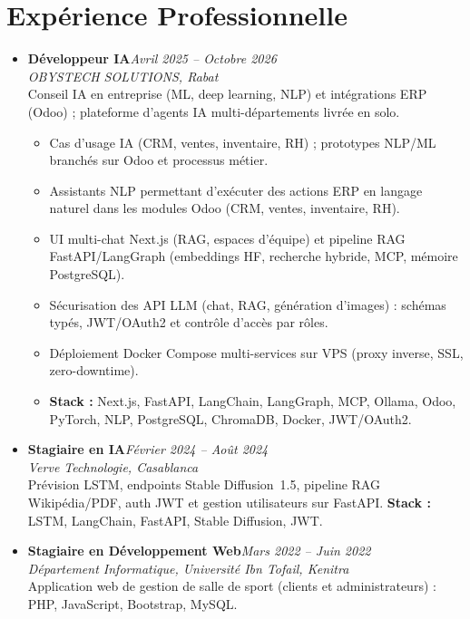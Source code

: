 \documentclass[10pt,a4paper]{article}
\newcommand{\role}[2]{\textbf{#1}\hfill\textit{\color{muted}#2}\\}
\newcommand{\org}[1]{\textit{#1}\\[0.5pt]}
\begin{document}
\section*{Expérience Professionnelle}
\begin{itemize}
    \item \role{Développeur IA}{Avril 2025 -- Octobre 2026}
          \org{OBYSTECH SOLUTIONS, Rabat}
          Conseil IA en entreprise (ML, deep learning, NLP) et intégrations ERP (Odoo) ; plateforme d'agents IA multi-départements livrée en solo.
          \begin{itemize}
              \item Cas d'usage IA (CRM, ventes, inventaire, RH) ; prototypes NLP/ML branchés sur Odoo et processus métier.
              \item Assistants NLP permettant d'exécuter des actions ERP en langage naturel dans les modules Odoo (CRM, ventes, inventaire, RH).
              \item UI multi-chat Next.js (RAG, espaces d'équipe) et pipeline RAG FastAPI/LangGraph (embeddings HF, recherche hybride, MCP, mémoire PostgreSQL).
              \item Sécurisation des API LLM (chat, RAG, génération d'images) : schémas typés, JWT/OAuth2 et contrôle d'accès par rôles.
              \item Déploiement Docker Compose multi-services sur VPS (proxy inverse, SSL, zero-downtime).
              \item \textbf{Stack :} Next.js, FastAPI, LangChain, LangGraph, MCP, Ollama, Odoo, PyTorch, NLP, PostgreSQL, ChromaDB, Docker, JWT/OAuth2.
          \end{itemize}

    \item \role{Stagiaire en IA}{Février 2024 -- Août 2024}
          \org{Verve Technologie, Casablanca}
          Prévision LSTM, endpoints Stable Diffusion~1.5, pipeline RAG Wikipédia/PDF, auth JWT et gestion utilisateurs sur FastAPI.
          \textbf{Stack :} LSTM, LangChain, FastAPI, Stable Diffusion, JWT.

    \item \role{Stagiaire en Développement Web}{Mars 2022 -- Juin 2022}
          \org{Département Informatique, Université Ibn Tofail, Kenitra}
          Application web de gestion de salle de sport (clients et administrateurs) : PHP, JavaScript, Bootstrap, MySQL.
\end{itemize}

\end{document}
